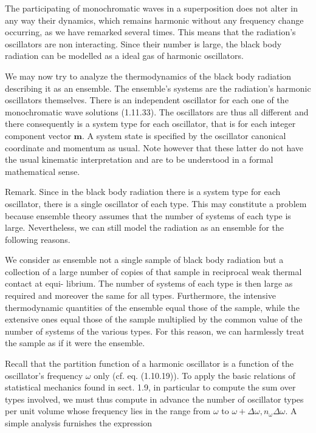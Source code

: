 \documentclass{article}
\begin{document}
The participating of monochromatic waves in a superposition does not alter in any way their dynamics, which remains harmonic without any frequency change occurring, as we have remarked several times. This means that the radiation's oscillators are non interacting. Since their number is large, the black body radiation can be modelled as a ideal gas of harmonic oscillators.

We may now try to analyze the thermodynamics of the black body radiation describing it as an ensemble. The ensemble's systems are the radiation's harmonic oscillators themselves. There is an independent oscillator for each one of the monochromatic wave solutions (1.11.33). The oscillators are thus all different and there consequently is a system type for each oscillator, that is for each integer component vector $\boldsymbol{m}$. A system state is specified by the oscillator canonical coordinate and momentum as usual. Note however that these latter do not have the usual kinematic interpretation and are to be understood in a formal mathematical sense.

Remark. Since in the black body radiation there is a system type for each oscillator, there is a single oscillator of each type. This may constitute a problem because ensemble theory assumes that the number of systems of each type is large. Nevertheless, we can still model the radiation as an ensemble for the following reasons.

We consider as ensemble not a single sample of black body radiation but a collection of a large number of copies of that sample in reciprocal weak thermal contact at equi-
librium. The number of systems of each type is then large as required and moreover the same for all types. Furthermore, the intensive thermodynamic quantities of the ensemble equal those of the sample, while the extensive ones equal those of the sample multiplied by the common value of the number of systems of the various types. For this reason, we can harmlessly treat the sample as if it were the ensemble.

Recall that the partition function of a harmonic oscillator is a function of the oscillator's frequency $\omega$ only (cf. eq. (1.10.19)). To apply the basic relations of statistical mechanics found in sect. 1.9, in particular to compute the sum over types involved, we must thus compute in advance the number of oscillator types per unit volume whose frequency lies in the range from $\omega$ to $\omega+\Delta \omega, n_{\omega} \Delta \omega$. A simple analysis furnishes the expression
 
\end{document}
